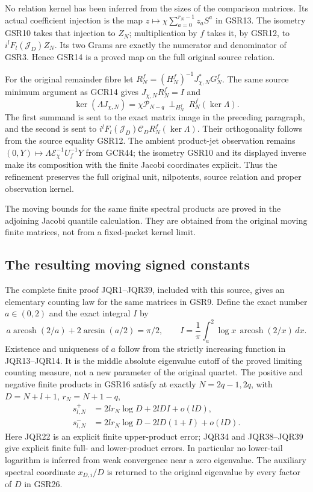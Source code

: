 No relation kernel has been inferred from the sizes of the
comparison matrices. Its actual coefficient injection is
the map $z\mapsto\chi\sum_{a=0}^{r_N-1}z_aS^a$ in GSR13.
The isometry GSR10 takes that injection to $Z_N$;
multiplication by $f$ takes it, by GSR12, to
$i^lF_l(\mathcal J_D)Z_N$. Its two Grams are exactly the
numerator and denominator of GSR3. Hence GSR14 is a proved
map on the full original source relation.

For the original remainder fibre let
$R_N^f=(H_N^f)^{-1}J_{\chi,N}^*G_N^f$.
The same source minimum argument as GCR14 gives
$J_{\chi,N}R_N^f=I$ and
\[
 \ker(\Lambda J_{\chi,N})
    =\chi\mathcal P_{N-q}\ \mathbin{\perp_{H_N^f}}\
                         R_N^f(\ker\Lambda).
\tag{GSR24}
\]
The first summand is sent to the exact matrix image in the
preceding paragraph, and the second is sent to
$i^lF_l(\mathcal J_D)\mathcal C_D R_N^f(\ker\Lambda)$.
Their orthogonality follows from the source equality GSR12.
The ambient product-jet observation remains
$(0,Y)\mapsto\Lambda\mathcal E_\chi^{-1}U_f^{-1}Y$
from GCR44; the isometry GSR10 and its displayed inverse
make its composition with the finite Jacobi coordinates
explicit. Thus the refinement preserves the full original
unit, nilpotents, source relation and proper observation kernel.

The moving bounds for the same finite spectral products are
proved in the adjoining Jacobi quantile calculation. They
are obtained from the original moving finite matrices,
not from a fixed-packet kernel limit.

\subsection{The resulting moving signed constants}

The complete finite proof JQR1--JQR39, included with this source,
gives an elementary counting law for the same matrices in GSR9.
Define the exact number $a\in(0,2)$ and the exact integral $I$ by
\[
 a\operatorname{arcosh}(2/a)+2\arcsin(a/2)=\pi/2,\qquad
 I=\frac1\pi\int_a^2\log x\,\operatorname{arcosh}(2/x)\,dx.
\tag{GSR25}
\]
Existence and uniqueness of $a$ follow from the strictly
increasing function in JQR13--JQR14. It is the middle absolute
eigenvalue cutoff of the proved limiting counting measure,
not a new parameter of the original quartet.
The positive and negative finite products in GSR16 satisfy
at exactly $N=2q-1,2q$, with $D=N+l+1$, $r_N=N+1-q$,
\[
\begin{split}
 s^+_{l,N}
     &=2lr_N\log D+2lD I+o(lD),\\
 s^-_{l,N}
     &=2lr_N\log D-2lD(1+I)+o(lD).
\end{split}\tag{GSR26}
\]
Here JQR22 is an explicit finite upper-product error;
JQR34 and JQR38--JQR39 give explicit finite full- and
lower-product errors. In particular no lower-tail logarithm
is inferred from weak convergence near a zero eigenvalue.
The auxiliary spectral coordinate $x_{D,i}/D$ is returned
to the original eigenvalue by every factor of $D$ in GSR26.

